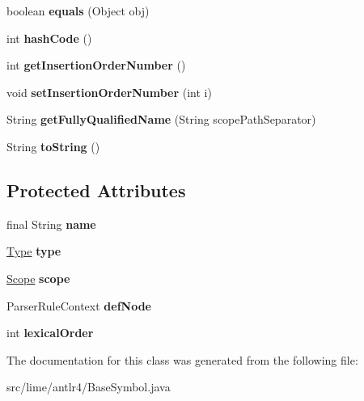 \begin{DoxyCompactItemize}
boolean {\bfseries equals} (Object obj)
\item 
\mbox{\label{classlime_1_1antlr4_1_1BaseSymbol_a751b0abe7249c5fe0d3b1d6d7df8fe42}} 
int {\bfseries hash\+Code} ()
\item 
\mbox{\label{classlime_1_1antlr4_1_1BaseSymbol_aa6fe99025a62bc81423dbc06d979ca94}} 
int {\bfseries get\+Insertion\+Order\+Number} ()
\item 
\mbox{\label{classlime_1_1antlr4_1_1BaseSymbol_a58a350b374bb0f0de7babdd90ab9bd84}} 
void {\bfseries set\+Insertion\+Order\+Number} (int i)
\item 
\mbox{\label{classlime_1_1antlr4_1_1BaseSymbol_a994af1cc58ec3d293c8c4af4465889ad}} 
String {\bfseries get\+Fully\+Qualified\+Name} (String scope\+Path\+Separator)
\item 
\mbox{\label{classlime_1_1antlr4_1_1BaseSymbol_a04a7f7972a61c30e9ea4cf02350286b4}} 
String {\bfseries to\+String} ()
\end{DoxyCompactItemize}
\subsection*{Protected Attributes}
\begin{DoxyCompactItemize}
\item 
\mbox{\label{classlime_1_1antlr4_1_1BaseSymbol_ab56d427263f9becd162f7f2c5ee6bac8}} 
final String {\bfseries name}
\item 
\mbox{\label{classlime_1_1antlr4_1_1BaseSymbol_a950da5974a979aff4431e27a067fc67a}} 
\hyperlink{interfacelime_1_1antlr4_1_1Type}{Type} {\bfseries type}
\item 
\mbox{\label{classlime_1_1antlr4_1_1BaseSymbol_a2466b0e9d5abfffcdcfd85872175af9a}} 
\hyperlink{interfacelime_1_1antlr4_1_1Scope}{Scope} {\bfseries scope}
\item 
\mbox{\label{classlime_1_1antlr4_1_1BaseSymbol_a29643bf09e99211b2c7c622426c90fdf}} 
Parser\+Rule\+Context {\bfseries def\+Node}
\item 
\mbox{\label{classlime_1_1antlr4_1_1BaseSymbol_aa96ed257b534e0652e37cb2cb7b510ac}} 
int {\bfseries lexical\+Order}
\end{DoxyCompactItemize}


The documentation for this class was generated from the following file\+:\begin{DoxyCompactItemize}
\item 
src/lime/antlr4/Base\+Symbol.\+java\end{DoxyCompactItemize}
